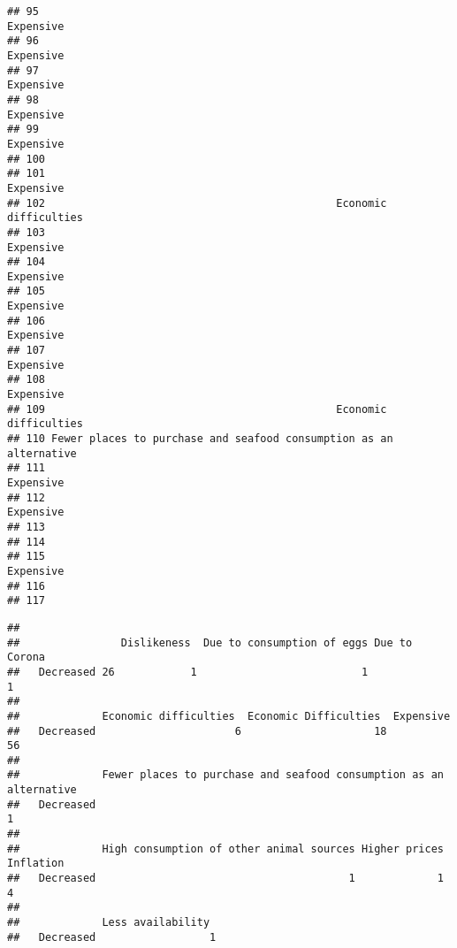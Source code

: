 \documentclass[
]{article}
\newenvironment{Shaded}{\begin{snugshade}}{\end{snugshade}}
\newcommand{\FunctionTok}[1]{\textcolor[rgb]{0.13,0.29,0.53}{\textbf{#1}}}
\newcommand{\NormalTok}[1]{#1}
\newcommand{\OtherTok}[1]{\textcolor[rgb]{0.56,0.35,0.01}{#1}}
\newcommand{\SpecialCharTok}[1]{\textcolor[rgb]{0.81,0.36,0.00}{\textbf{#1}}}
\begin{document}
\begin{verbatim}
## 95                                                           Expensive 
## 96                                                           Expensive 
## 97                                                           Expensive 
## 98                                                           Expensive 
## 99                                                           Expensive 
## 100                                                                    
## 101                                                          Expensive 
## 102                                              Economic difficulties 
## 103                                                          Expensive 
## 104                                                          Expensive 
## 105                                                          Expensive 
## 106                                                          Expensive 
## 107                                                          Expensive 
## 108                                                          Expensive 
## 109                                              Economic difficulties 
## 110 Fewer places to purchase and seafood consumption as an alternative 
## 111                                                          Expensive 
## 112                                                          Expensive 
## 113                                                                    
## 114                                                                    
## 115                                                          Expensive 
## 116                                                                    
## 117
\end{verbatim}

\begin{Shaded}
\end{Shaded}

\begin{verbatim}
##            
##                Dislikeness  Due to consumption of eggs Due to Corona
##   Decreased 26            1                          1             1
##            
##             Economic difficulties  Economic Difficulties  Expensive 
##   Decreased                      6                     18         56
##            
##             Fewer places to purchase and seafood consumption as an alternative 
##   Decreased                                                                   1
##            
##             High consumption of other animal sources Higher prices Inflation 
##   Decreased                                        1             1          4
##            
##             Less availability 
##   Decreased                  1
\end{verbatim}
\end{document}
